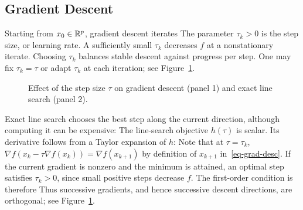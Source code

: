 \subsection{Gradient Descent}

Starting from $x_0 \in \mathbb{R}^p$, gradient descent iterates
The parameter $\tau_k>0$ is the step size, or learning rate. A sufficiently small $\tau_k$ decreases $f$ at a nonstationary iterate. Choosing $\tau_k$ balances stable descent against progress per step.
%
One may fix $\tau_k=\tau$ or adapt $\tau_k$ at each iteration; see Figure~\ref{fig-gradesc}.


\begin{figure}[tbp]
\centering
{}\hfill
{}
\caption{Effect of the step size $\tau$ on gradient descent (panel 1) and exact line search (panel 2).}
\label{fig-gradesc}
\end{figure}


\begin{rem}
Exact line search chooses the best step along the current direction, although computing it can be expensive:
The line-search objective $h(\tau)$ is scalar. Its derivative follows from a Taylor expansion of $h$:
Note that at $\tau=\tau_k$, $\nabla f(x_k-\tau \nabla f(x_k))=\nabla f(x_{k+1})$ by definition of $x_{k+1}$ in~\eqref{eq-grad-desc}.
%
If the current gradient is nonzero and the minimum is attained, an optimal step satisfies $\tau_k>0$, since small positive steps decrease $f$. The first-order condition is therefore
Thus successive gradients, and hence successive descent directions, are orthogonal; see Figure~\ref{fig-gradesc}.
\end{rem}


